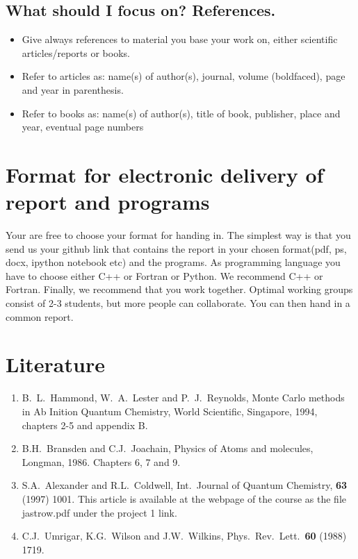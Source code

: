 \documentclass[10pt]{article}
\begin{document}
\subsection*{What should I focus on? References.}
\begin{itemize}
\item Give always references to material you base your work on, either scientific articles/reports or books.
\item Refer to articles as: name(s) of author(s), journal, volume (boldfaced), page and year in parenthesis.
\item Refer to books as: name(s) of author(s), title of book, publisher, place and year, eventual page numbers
\end{itemize}



\section*{Format for electronic delivery of report and programs}
%
Your are free to choose your format for handing in. The simplest way is that you send us your github link that contains the report in your chosen format(pdf, ps, docx, ipython notebook etc) and the programs.
As programming language you have to choose either C++ or Fortran or Python. We recommend C++ or Fortran.
Finally, 
we recommend that you work together. Optimal working groups consist of 
2-3 students, but more people can collaborate. You can then hand in a common report. 





\section*{Literature}
\begin{enumerate}
\item B.~L.~Hammond, W.~A.~Lester and P.~J.~Reynolds, Monte Carlo methods
in Ab Inition Quantum Chemistry, World Scientific, Singapore, 1994, chapters
2-5 and appendix B.

\item B.H.~Bransden and C.J.~Joachain, Physics of Atoms and molecules,
Longman, 1986. Chapters 6, 7 and 9.
\item S.A.~Alexander and R.L.~Coldwell,
Int.~Journal of Quantum Chemistry, {\bf 63} (1997) 1001.  This article is available 
at the webpage of the course as the file jastrow.pdf under the project 1 link.
\item C.J.~Umrigar, K.G.~Wilson and J.W.~Wilkins, Phys.~Rev.~Lett.~{\bf 60}
(1988) 1719. 



\end{enumerate}
\end{document}
